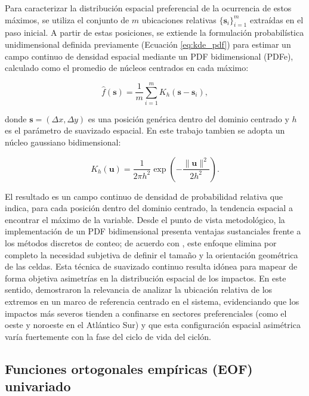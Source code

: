 Para caracterizar la distribución espacial preferencial de la ocurrencia de estos máximos, se utiliza el conjunto de $m$ ubicaciones relativas $\{\mathbf{s}_i\}_{i=1}^{m}$ extraídas en el paso inicial.
A partir de estas posiciones, se extiende la formulación probabilística unidimensional definida previamente (Ecuación \ref{eq:kde_pdf}) para estimar un campo continuo de densidad espacial mediante un PDF bidimensional (PDFe), calculado como el promedio de núcleos centrados en cada máximo:

\begin{equation}
\hat f(\mathbf{s})=\frac{1}{m}\sum_{i=1}^{m} K_h(\mathbf{s}-\mathbf{s}_i),
\label{eq:kde_simple}
\end{equation}

donde $\mathbf{s}=(\Delta x,\Delta y)$ es una posición genérica dentro del dominio centrado y $h$ es el parámetro de suavizado espacial. En este trabajo tambien se adopta un núcleo gaussiano bidimensional:

\begin{equation}
K_h(\mathbf{u})=\frac{1}{2\pi h^2}\exp\!\left(-\frac{\|\mathbf{u}\|^2}{2h^2}\right).
\label{eq:gauss_kernel_2d_simple}
\end{equation}

El resultado es un campo continuo de densidad de probabilidad relativa que indica, para cada posición dentro del dominio centrado, la tendencia espacial a encontrar el máximo de la variable. 
Desde el punto de vista metodológico, la implementación de un PDF bidimensional presenta ventajas sustanciales frente a los métodos discretos de conteo; de acuerdo con \citet{weglarczyk2018kernel}, este enfoque elimina por completo la necesidad subjetiva de definir el tamaño y la orientación geométrica de las celdas. Esta técnica de suavizado continuo resulta idónea para mapear de forma objetiva asimetrías en la distribución espacial de los impactos. En este sentido, \citet{gramcianinov2023impact} demostraron la relevancia de analizar la ubicación relativa de los extremos en un marco de referencia centrado en el sistema, evidenciando que los impactos más severos tienden a confinarse en sectores preferenciales (como el oeste y noroeste en el Atlántico Sur) y que esta configuración espacial asimétrica varía fuertemente con la fase del ciclo de vida del ciclón.

\subsection{Funciones ortogonales empíricas (EOF) univariado}\label{subsec:eof_univariado}

